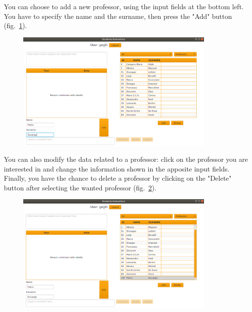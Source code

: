 \documentclass[a4paper]{article}
\begin{document}
You can choose to add a new professor, using the input fields at the bottom left. You have to specify the name and the surname, then press the "Add" button (fig.~\ref{fig:admin1}).
\begin{figure}[h]
\centering
\includegraphics[width=0.88\textwidth]{images/screens/admin1}
\label{fig:admin1}
\end{figure}
\clearpage
You can also modify the data related to a professor: click on the professor you are interested in and change the information shown in the apposite input fields. Finally, you have the chance to delete a professor by clicking on the "Delete" button after selecting the wanted professor (fig.~\ref{fig:admin2}).
\begin{figure}[h]
\centering
\includegraphics[width=0.88\textwidth]{images/screens/admin2}
\label{fig:admin2}
\end{figure}
\end{document}
